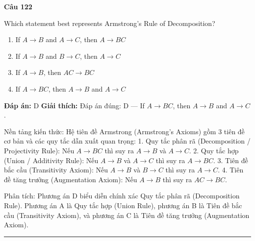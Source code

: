 \documentclass[11pt,a4paper]{article}
\newenvironment{question}[1]{%
  \par\vspace{1em}\noindent\textbf{\large Câu #1}\par\vspace{0.4em}
}{%
  \par\vspace{1em}\hrule\vspace{0.6em}
}
\newenvironment{choices}{%
  \begin{enumerate}[label=\textbf{\Alph*.},leftmargin=2.2em,itemsep=2pt,topsep=3pt]
}{%
  \end{enumerate}
}
\newcommand{\choice}{\item}
\begin{document}
\begin{question}{122}
Which statement best represents Armstrong's Rule of Decomposition?
\begin{choices}
\choice If $A \to B$ and $A \to C$, then $A \to BC$
\choice If $A \to B$ and $B \to C$, then $A \to C$
\choice If $A \to B$, then $AC \to BC$
\choice If $A \to BC$, then $A \to B$ and $A \to C$
\end{choices}
\textbf{Đáp án:} D
\textbf{Giải thích:} Đáp án đúng: D — If $A \to BC$, then $A \to B$ and $A \to C$.

Nền tảng kiến thức: Hệ tiên đề Armstrong (Armstrong's Axioms) gồm 3 tiên đề cơ bản và các quy tắc dẫn xuất quan trọng:
1. Quy tắc phân rã (Decomposition / Projectivity Rule): Nếu $A \to BC$ thì suy ra $A \to B$ và $A \to C$.
2. Quy tắc hợp (Union / Additivity Rule): Nếu $A \to B$ và $A \to C$ thì suy ra $A \to BC$.
3. Tiên đề bắc cầu (Transitivity Axiom): Nếu $A \to B$ và $B \to C$ thì suy ra $A \to C$.
4. Tiên đề tăng trưởng (Augmentation Axiom): Nếu $A \to B$ thì suy ra $AC \to BC$.

Phân tích: Phương án D biểu diễn chính xác Quy tắc phân rã (Decomposition Rule). Phương án A là Quy tắc hợp (Union Rule), phương án B là Tiên đề bắc cầu (Transitivity Axiom), và phương án C là Tiên đề tăng trưởng (Augmentation Axiom).
\end{question}
\end{document}
